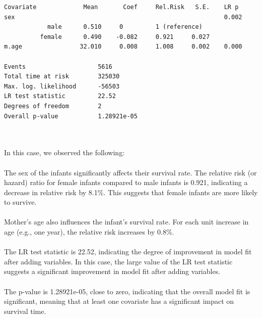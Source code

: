 \documentclass[12pt,letterpaper]{article}
\begin{document}

\begin{verbatim}
Covariate             Mean       Coef     Rel.Risk   S.E.    LR p
sex                                                          0.002 
            male      0.510     0         1 (reference)
          female      0.490    -0.082     0.921     0.027
m.age                32.010     0.008     1.008     0.002    0.000 

Events                    5616 
Total time at risk        325030 
Max. log. likelihood      -56503 
LR test statistic         22.52 
Degrees of freedom        2 
Overall p-value           1.28921e-05
\end{verbatim}
\\\\
In this case, we observed the following:\\\\
The sex of the infants significantly affects their survival rate. The relative risk (or hazard) ratio for female infants compared to male infants is 0.921, indicating a decrease in relative risk by 8.1\%. This suggests that female infants are more likely to survive.\\\\
Mother's age also influences the infant's survival rate. For each unit increase in age (e.g., one year), the relative risk increases by 0.8\%.\\\\
The LR test statistic is 22.52, indicating the degree of improvement in model fit after adding variables. In this case, the large value of the LR test statistic suggests a significant improvement in model fit after adding variables.\\\\
The p-value is 1.28921e-05, close to zero, indicating that the overall model fit is significant, meaning that at least one covariate has a significant impact on survival time.\\\\


\end{document}
